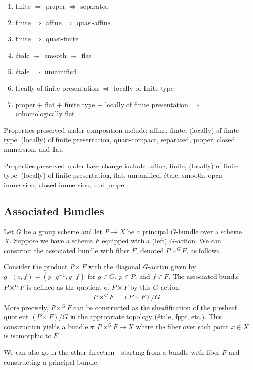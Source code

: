 \documentclass[12pt]{article}
\begin{document}
\begin{enumerate}
    \item finite $\Rightarrow$ proper $\Rightarrow$ separated
    \item finite $\Rightarrow$ affine $\Rightarrow$ quasi-affine
    \item finite $\Rightarrow$ quasi-finite
    \item étale $\Rightarrow$ smooth $\Rightarrow$ flat
    \item étale $\Rightarrow$ unramified
    \item locally of finite presentation $\Rightarrow$ locally of finite type
    \item proper + flat + finite type + locally of finite presentation $\Rightarrow$ cohomologically flat
\end{enumerate}

Properties preserved under composition include: affine, finite, (locally) of finite type, (locally) of finite presentation, quasi-compact, separated, proper, closed immersion, and flat.

Properties preserved under base change include: affine, finite, (locally) of finite type, (locally) of finite presentation, flat, unramified, étale, smooth, open immersion, closed immersion, and proper.
\subsection{Associated Bundles}

Let $G$ be a group scheme and let $P \to X$ be a principal $G$-bundle over a scheme $X$. Suppose we have a scheme $F$ equipped with a (left) $G$-action. We can construct the associated bundle with fiber $F$, denoted $P \times^G F$, as follows.

Consider the product $P \times F$ with the diagonal $G$-action given by $g \cdot (p, f) = (p \cdot g^{-1}, g \cdot f)$ for $g \in G$, $p \in P$, and $f \in F$. The associated bundle $P \times^G F$ is defined as the quotient of $P \times F$ by this $G$-action:
\begin{align*}
P \times^G F = (P \times F)/G
\end{align*}
More precisely, $P \times^G F$ can be constructed as the sheafification of the presheaf quotient $(P \times F)/G$ in the appropriate topology (étale, fppf, etc.). This construction yields a bundle $\pi: P \times^G F \to X$ where the fiber over each point $x \in X$ is isomorphic to $F$.

We can also go in the other direction - starting from a bundle with fiber $F$ and constructing a principal bundle. 
\end{document}
